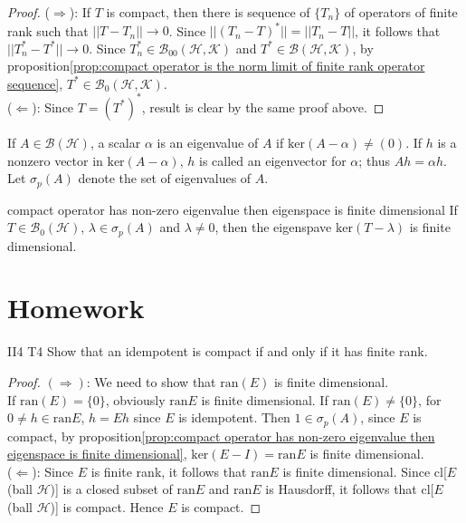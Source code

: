 \begin{proof}
    ($\Rightarrow$):
    If $T$ is compact, then there is sequence of $\{T_n\}$ of operators of finite rank
    such that $||T-T_n||\rightarrow 0$.
    Since $||(T_n-T)^*||=||T_n-T||$, it follows that $||T_n^*-T^*||\rightarrow 0$.
    Since $T_n^*\in\mathscr{B}_{00}(\mathscr{H},\mathscr{K})$ and $T^*\in\mathscr{B}(\mathscr{H},\mathscr{K})$,
    by proposition\ref{prop:compact operator is the norm limit of finite rank operator sequence}, $T^*\in\mathscr{B}_0(\mathscr{H},\mathscr{K})$.\\
    ($\Leftarrow$):
    Since $T=(T^*)^*$, result is clear by the same proof above. 
\end{proof}

\begin{definition}{}{}
    If $A\in\mathscr{B}(\mathscr{H})$, a scalar $\alpha$ is an eigenvalue of $A$ if $\text{ker}(A-\alpha)\neq (0)$.
    If $h$ is a nonzero vector in $\text{ker}(A-\alpha)$,
    $h$ is called an eigenvector for $\alpha$; thus $Ah=\alpha h$.
    Let $\sigma_p(A)$ denote the set of eigenvalues of $A$.
\end{definition}

\begin{proposition}{}{compact operator has non-zero eigenvalue then eigenspace is finite dimensional}
    If $T\in\mathscr{B}_0(\mathscr{H})$, $\lambda \in\sigma_p(A)$ and $\lambda\neq 0$, then the eigenspave $\text{ker}(T-\lambda)$ is finite dimensional.
\end{proposition}



\section{Homework}

\begin{exercise}{II4 T4}{}
    Show that an idempotent is compact if and only if it has finite rank.
\end{exercise}

\begin{proof}
    $(\Rightarrow)$:
    We need to show that $\text{ran}(E)$ is finite dimensional.\\
    If $\text{ran}(E)=\{0\}$, obviously $\text{ran}E$ is finite dimensional.
    If $\text{ran}(E)\neq \{0\}$, for $0\neq h\in\text{ran}E$, $h=Eh$ since $E$ is idempotent.
    Then $1\in\sigma_p(A)$, since $E$ is compact, by proposition\ref{prop:compact operator has non-zero eigenvalue then eigenspace is finite dimensional},
    $\text{ker}(E-I)=\text{ran}E$ is finite dimensional. \\
    ($\Leftarrow$):
    Since $E$ is finite rank, it follows that $\text{ran}E$ is finite dimensional.
    Since cl[$E$(ball $\mathscr{H}$)] is a closed subset of $\text{ran}E$ 
    and $\text{ran}E$ is Hausdorff,
    it follows that cl[$E$(ball $\mathscr{H}$)] is compact. Hence $E$ is compact.
\end{proof}


